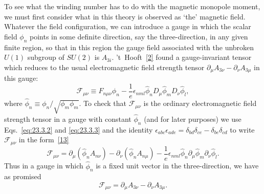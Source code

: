 To see what the winding number has to do with the magnetic monopole
moment, we must first consider what in this theory is observed as `the'
magnetic field. Whatever the field configuration, we can introduce a
gauge in which the scalar field $\phi_n$ points in some definite direction,
say the three-direction, in any given finite region, so that in this region
the gauge field associated with the unbroken $U(1)$ subgroup of $SU(2)$ is
$A_{3i}$. 't~Hooft~\hyperref[ch23-ref-2]{[2]} found a gauge-invariant
tensor which reduces to the usual electromagnetic field strength tensor
$\partial_\mu A_{3\nu}-\partial_\nu A_{3\mu}$ in this gauge:
\begin{equation}
 \mathcal F_{\mu\nu}\equiv
 F_{n\mu\nu}\hat\phi_n
 -\frac1e\epsilon_{nml}\hat\phi_n
 D_\mu\hat\phi_mD_\nu\hat\phi_l,
 \tag{23.3.5}\label{eq:23.3.5}
\end{equation}
where
$\hat\phi_n\equiv\phi_n/\sqrt{\phi_m\phi_m}$. To check that
$\mathcal F_{\mu\nu}$ is the ordinary electromagnetic field strength
tensor in a gauge with constant $\hat\phi_n$ (and for later purposes) we
use Eqs.~\eqref{eq:23.3.2} and \eqref{eq:23.3.3} and the identity
$\epsilon_{abc}\epsilon_{ade}
=\delta_{bd}\delta_{ce}-\delta_{be}\delta_{cd}$ to write
$\mathcal F_{\mu\nu}$ in the form~\hyperref[ch23-ref-13]{[13]}
\begin{equation}
 \mathcal F_{\mu\nu}
 =\partial_\mu(\hat\phi_nA_{n\nu})
 -\partial_\nu(\hat\phi_nA_{n\mu})
 -\frac1e\epsilon_{nml}\hat\phi_n
 \partial_\mu\hat\phi_m\partial_\nu\hat\phi_l.
 \tag{23.3.6}\label{eq:23.3.6}
\end{equation}
Thus in a gauge in which $\hat\phi_n$ is a fixed unit vector in the
three-direction, we have as promised
\[
 \mathcal F_{\mu\nu}
 =\partial_\mu A_{3\nu}-\partial_\nu A_{3\mu}.
\]

